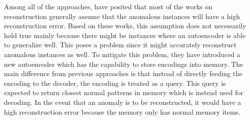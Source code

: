 Among all of the approaches,  have posited that most of the works on reconstruction generally assume that the anomalous instances will have a high reconstruction error. Based on these works, this assumption does not necessarily hold true mainly because there might be instances where an autoencoder is able to generalize well. This poses a problem since it might accurately reconstruct anomalous instances as well. To mitigate this problem, they have introduced a new autoencoder which has the capability to store encodings into memory. The main difference from previous approaches is that instead of directly feeding the encoding to the decoder, the encoding is treated as a query. This query is expected to return closest normal patterns in memory which is instead used for decoding. In the event that an anomaly is to be reconstructed, it would have a high reconstruction error because the memory only has normal memory items.


